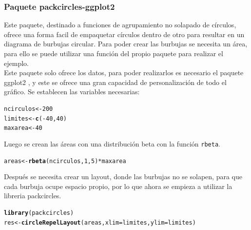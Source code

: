 \documentclass{article}\usepackage[]{graphicx}\usepackage[]{color}
\makeatletter
\newcommand{\hlnum}[1]{\textcolor[rgb]{0.686,0.059,0.569}{#1}}%
\newcommand{\hlopt}[1]{\textcolor[rgb]{0,0,0}{#1}}%
\newcommand{\hlstd}[1]{\textcolor[rgb]{0.345,0.345,0.345}{#1}}%
\newcommand{\hlkwb}[1]{\textcolor[rgb]{0.69,0.353,0.396}{#1}}%
\newcommand{\hlkwc}[1]{\textcolor[rgb]{0.333,0.667,0.333}{#1}}%
\newcommand{\hlkwd}[1]{\textcolor[rgb]{0.737,0.353,0.396}{\textbf{#1}}}%
\newenvironment{kframe}{%
 \def\at@end@of@kframe{}%
 \ifinner\ifhmode%
  \def\at@end@of@kframe{\end{minipage}}%
  \begin{minipage}{\columnwidth}%
 \fi\fi%
 \def\FrameCommand##1{\hskip\@totalleftmargin \hskip-\fboxsep
 \colorbox{shadecolor}{##1}\hskip-\fboxsep
     \hskip-\linewidth \hskip-\@totalleftmargin \hskip\columnwidth}%
 \MakeFramed {\advance\hsize-\width
   \@totalleftmargin\z@ \linewidth\hsize
   \@setminipage}}%
 {\par\unskip\endMakeFramed%
 \at@end@of@kframe}
\newenvironment{knitrout}{}{} %
\makeatother
\begin{document}
\subsubsection{Paquete packcircles-ggplot2}
Este paquete, %
destinado a funciones de agrupamiento no solapado de c\'irculos, ofrece una forma facil de empaquetar c\'irculos dentro de otro para resultar en un diagrama de burbujas circular.
Para poder crear las burbujas se necesita un \'area, para ello se puede utilizar una funci\'on del propio paquete para realizar el ejemplo.~\\
Este paquete solo ofrece los datos, para poder realizarlos es necesario el paquete ggplot2 %
, y este se ofrece una gran capacidad de personalizaci\'on de todo el gr\'afico.
Se establecen las variables necesarias:
\begin{knitrout}
\color{fgcolor}\begin{kframe}
\begin{alltt}
\hlstd{ncirculos} \hlkwb{<-} \hlnum{200}
\hlstd{limites} \hlkwb{<-} \hlkwd{c}\hlstd{(}\hlopt{-}\hlnum{40} \hlstd{,} \hlnum{40}\hlstd{)}
\hlstd{maxarea} \hlkwb{<-} \hlnum{40}
\end{alltt}
\end{kframe}
\end{knitrout}
Luego se crean las \'areas con una distribuci\'on beta con la funci\'on \texttt{rbeta}.
\begin{knitrout}
\color{fgcolor}\begin{kframe}
\begin{alltt}
\hlstd{areas} \hlkwb{<-} \hlkwd{rbeta}\hlstd{(ncirculos,} \hlnum{1}\hlstd{,} \hlnum{5}\hlstd{)} \hlopt{*} \hlstd{maxarea}
\end{alltt}
\end{kframe}
\end{knitrout}
Despu\'es se necesita crear un layout, donde las burbujas no se solapen, para que cada burbuja ocupe espacio propio, por lo que ahora se empieza a utilizar la libreria packcircles.
\begin{knitrout}
\color{fgcolor}\begin{kframe}
\begin{alltt}
\hlkwd{library}\hlstd{(packcircles)}
\hlstd{res} \hlkwb{<-} \hlkwd{circleRepelLayout}\hlstd{(areas,} \hlkwc{xlim} \hlstd{= limites,} \hlkwc{ylim} \hlstd{= limites)}
\end{alltt}
\end{kframe}
\end{knitrout}
\end{document}
